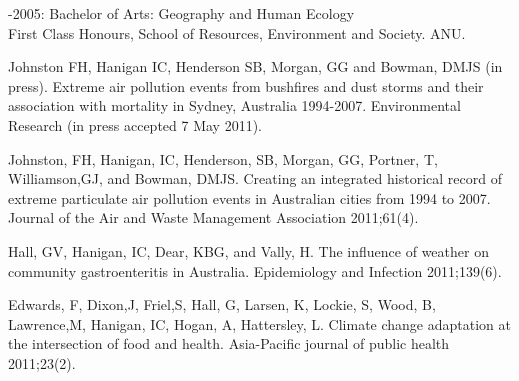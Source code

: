\documentclass[a4paper,11pt]{article}
\begin{document}
-2005: Bachelor of Arts: Geography and Human Ecology \\First Class Honours, School of Resources, Environment and Society. ANU.


\medskip

 
\medskip

 
\normalsize

 


\ind Johnston FH, Hanigan IC, Henderson SB, Morgan, GG and Bowman, DMJS (in press). Extreme air pollution events from bushfires and dust storms and their association with mortality in Sydney, Australia 1994-2007.  Environmental Research (in press accepted 7 May 2011).

\ind Johnston, FH, Hanigan, IC, Henderson, SB, Morgan, GG, Portner, T, Williamson,GJ, and Bowman, DMJS. Creating an integrated historical record of extreme particulate air pollution events in Australian cities from 1994 to 2007. Journal of the Air and Waste Management Association 2011;61(4).

\ind Hall, GV, Hanigan, IC, Dear, KBG, and Vally, H. The influence of weather on community gastroenteritis in Australia. Epidemiology and Infection 2011;139(6).

\ind Edwards, F, Dixon,J, Friel,S, Hall, G, Larsen, K, Lockie, S, Wood, B, Lawrence,M, Hanigan, IC, Hogan, A, Hattersley, L. Climate change adaptation at the intersection of food and health. Asia-Pacific journal of public health 2011;23(2). 
\end{document}
